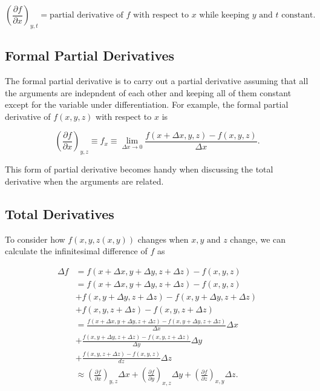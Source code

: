 \documentclass[english,a4paper,12pt]{report}
\begin{document}
\begin{equation}
	\left( \frac{\partial f}{\partial x}  \right)_{y,t} = \text{partial derivative of \(f\) with respect to \(x\) while keeping \(y\) and \(t\) constant.}  
\end{equation}

\subsection{Formal Partial Derivatives}

The formal partial derivative is to carry out a partial derivative assuming that all the arguments are indepndent of each other and keeping all of them constant except for the variable under differentiation. For example, the formal partial derivative of \(f(x,y,z)\) with respect to \(x\) is 

\begin{equation}
	\left( \frac{\partial f}{\partial x} \right)_{y,z} \equiv f_{x} \equiv  \lim_{\Delta x \to 0} \frac{f(x+\Delta x,y,z) - f(x,y,z)}{\Delta x}.
\end{equation}

This form of partial derivative becomes handy when discussing the total derivative when the arguments are related.

\subsection{Total Derivatives}

To consider how \(f(x,y,z(x,y))\) changes when \(x,y \text { and } z\) change, we can calculate the infinitesimal difference of \(f\) as 

\begin{equation}
	\begin{aligned} 
	\Delta f &= f(x+\Delta x,y+\Delta y,z+\Delta z) - f(x,y,z) \\
	&= f(x+\Delta x,y+\Delta y,z+\Delta z) - f(x,y,z) \\
	&+ f(x,y+\Delta y,z+\Delta z) -f(x,y+\Delta y,z+\Delta z) \\
	&+ f(x,y,z+\Delta z) - f(x,y,z+\Delta z)\\
	&= \frac{f(x+\Delta x,y+\Delta y,z+\Delta z) - f(x,y+\Delta y,z+\Delta z)}{\Delta x} \Delta x \\
	&+ \frac{f(x,y+\Delta y,z+\Delta z)-f(x,y,z+\Delta z)}{\Delta y}\Delta y \\
	&+ \frac{f(x,y,z+\Delta z)-f(x,y,z)}{dz} \Delta z\\
	& \approx  \left( \frac{\partial f}{\partial x} \right)_{y,z} \Delta x + \left( \frac{\partial f}{\partial y} \right)_{x,z} \Delta y + \left( \frac{\partial f}{\partial z} \right)_{x,y} \Delta z.  
	\end{aligned} 
\end{equation}
\end{document}
